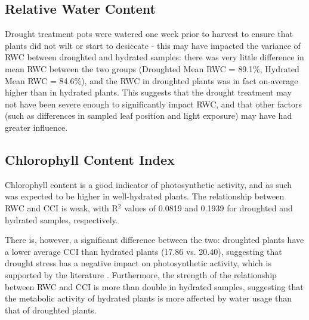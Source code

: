 \documentclass{report}
\begin{document}

\subsection*{Relative Water Content}

\hspace{24pt}Drought treatment pots were watered one week prior to harvest to ensure that plants did not wilt or start to desiccate - this may have impacted the variance of RWC between droughted and hydrated samples: there was very little difference in mean RWC between the two groups (Droughted Mean RWC = 89.1\%, Hydrated Mean RWC = 84.6\%), and the RWC in droughted plants was in fact on-average higher than in hydrated plants. This suggests that the drought treatment may not have been severe enough to significantly impact RWC, and that other factors (such as differences in sampled leaf position and light exposure) may have had greater influence.

\subsection*{Chlorophyll Content Index}

\hspace{24pt}Chlorophyll content is a good indicator of photosynthetic activity, and as such was expected to be higher in well-hydrated plants. The relationship between RWC and CCI is weak, with R${}^{2}$ values of 0.0819 and 0.1939 for droughted and hydrated samples, respectively.

\hspace{24pt}There is, however, a significant difference between the two: droughted plants have a lower average CCI than hydrated plants (17.86 vs. 20.40), suggesting that drought stress has a negative impact on photosynthetic activity, which is supported by the literature \parencite{chlorophyll}. Furthermore, the strength of the relationship between RWC and CCI is more than double in hydrated samples, suggesting that the metabolic activity of hydrated plants is more affected by water usage than that of droughted plants.
\end{document}
